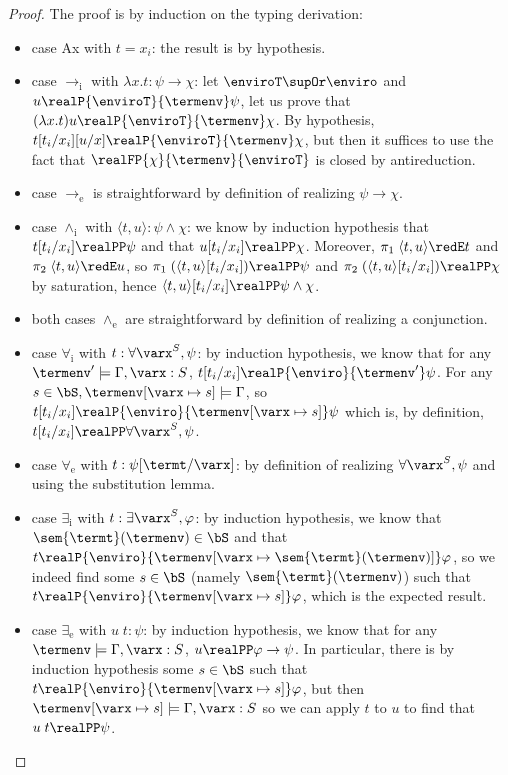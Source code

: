\endgroup

\begin{proof}%
  The proof is by induction on the typing derivation:
  \begin{itemize}
  \item case Ax with $t = x_i$: the result is by hypothesis.
  \item case $\to_\mathrm i$ with $\lambda x.t : \psi \to \chi$: let $\enviroT \supOr\enviro$ and $u \realP{\enviroT}{\termenv} \psi$, let us prove that $(\lambda x.t)u \realP{\enviroT}{\termenv} \chi$. By hypothesis, $t[t_i/x_i][u/x] \realP{\enviroT}{\termenv} \chi$, but then it suffices to use the fact that $\realFP{\chi}{\termenv}{\enviroT}$ is closed by antireduction.
  \item case $\to_\mathrm e$ is straightforward by definition of realizing $\psi \to \chi$.
  \item case $\land_\mathrm i$ with $\langle t,u \rangle : \psi \land \chi$: we know by induction hypothesis that $t[t_i/x_i] \realPP \psi$ and that $u[t_i/x_i] \realPP \chi$. Moreover, $\pi_1\; \langle t,u \rangle \redE t$ and $\pi_2\;\langle t,u \rangle \redE u$, so $\pi_1\;(\langle t,u\rangle[t_i/x_i]) \realPP\psi$ and $\pi_2\;(\langle t,u\rangle[t_i/x_i]) \realPP \chi$ by saturation, hence $\langle t,u\rangle [t_i/x_i] \realPP \psi\land \chi$.
  \item both cases $\land_\mathrm e$ are straightforward by definition of realizing a conjunction.
  \item case $\forall_\mathrm i$ with $t : \forall \varx^S, \psi$: by induction hypothesis, we know that for any $\termenv' \models \Gamma, \varx : S$, $t[t_i/x_i] \realP{\enviro}{\termenv'} \psi$. For any $s \in \bS, \termenv[\varx \mapsto s] \models \Gamma$, so $t[t_i/x_i] \realP{\enviro}{\termenv[\varx\mapsto s]} \psi$ which is, by definition, $t[t_i/x_i] \realPP \forall \varx^S,\psi$.
  \item case $\forall_\mathrm e$ with $t : \psi[\termt/\varx]$: by definition of realizing $\forall \varx^S, \psi$ and using the substitution lemma.
  \item case $\exists_\mathrm i$ with $t : \exists \varx^S, \varphi$: by induction hypothesis, we know that $\sem{\termt}(\termenv) \in \bS$ and that $t \realP{\enviro}{\termenv[\varx \mapsto \sem{\termt}(\termenv)]} \varphi$, so we indeed find some $s \in \bS$ (namely $\sem{\termt}(\termenv)$) such that $t \realP{\enviro}{\termenv[\varx\mapsto s]}\varphi$, which is the expected result.
  \item case $\exists_\mathrm e$ with $u\;t : \psi$: by induction hypothesis, we know that for any $\termenv\models \Gamma, \varx : S$, $u \realPP \varphi \to \psi$. In particular, there is by induction hypothesis some $s \in \bS$ such that $t \realP{\enviro}{\termenv[\varx \mapsto s]} \varphi$, but then $\termenv[\varx\mapsto s]\models \Gamma, \varx : S$ so we can apply $t$ to $u$ to find that $u\;t\realPP \psi$.

\end{itemize}
\end{proof}
